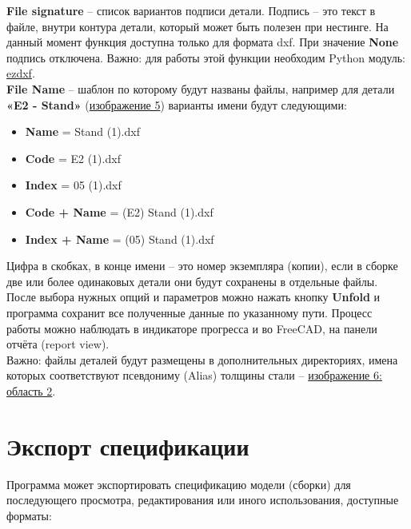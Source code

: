\documentclass[a4paper,12pt]{article}
\begin{document}
\textbf{File signature} -- список вариантов подписи детали. Подпись -- это текст в файле, внутри контура детали, который может быть полезен при нестинге. На данный момент функция доступна только для формата dxf. При значение \textbf{None} подпись отключена. Важно: для работы этой функции необходим Python модуль: \href{https://pypi.org/project/ezdxf/}{ezdxf}.\\

\textbf{File Name} -- шаблон по которому будут названы файлы, например для детали \textbf{«E2 - Stand»} (\hyperref[sec:properties]{изображение 5}) варианты имени будут следующими:
\begin{itemize}
	\item \textbf{Name} = Stand (1).dxf
	\item \textbf{Code} = E2 (1).dxf
	\item \textbf{Index} = 05 (1).dxf
	\item \textbf{Code + Name} = (E2) Stand (1).dxf
	\item \textbf{Index + Name} = (05) Stand (1).dxf
\end{itemize}

Цифра в скобках, в конце имени -- это номер экземпляра (копии), если в сборке две или более одинаковых детали они будут сохранены в отдельные файлы.\\

После выбора нужных опций и параметров можно нажать кнопку \textbf{Unfold} и программа сохранит все полученные данные по указанному пути. Процесс работы можно наблюдать в индикаторе прогресса и во FreeCAD, на панели отчёта (report view).\\

Важно: файлы деталей будут размещены в дополнительных директориях, имена которых соответствуют псевдониму (Alias) толщины стали -- \hyperref[sec:pref_sm]{изображение 6: область 2}.

\pagebreak




\section{Экспорт спецификации}

Программа может экспортировать спецификацию модели (сборки) для последующего просмотра, редактирования или иного использования, доступные форматы:
\end{document}
